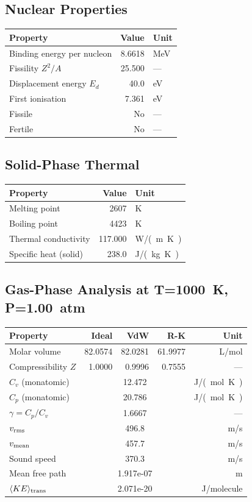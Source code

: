 \documentclass[11pt,a4paper]{article}
\begin{document}
\subsection{Nuclear Properties}
\begin{tabular}{lrl}
  \toprule
  Property & Value & Unit \\
  \midrule
  Binding energy per nucleon & 8.6618 & \si{MeV} \\
  Fissility $Z^2/A$ & 25.500 & --- \\
  Displacement energy $E_d$ & 40.0 & \si{eV} \\
  First ionisation & 7.361 & \si{eV} \\
  Fissile & No & --- \\
  Fertile & No & --- \\
  \bottomrule
\end{tabular}

\subsection{Solid-Phase Thermal}
\begin{tabular}{lrl}
  \toprule
  Property & Value & Unit \\
  \midrule
  Melting point & 2607 & \si{K} \\
  Boiling point & 4423 & \si{K} \\
  Thermal conductivity & 117.000 & \si{W/(m.K)} \\
  Specific heat (solid) & 238.0 & \si{J/(kg.K)} \\
  \bottomrule
\end{tabular}

\subsection{Gas-Phase Analysis at T=\SI{1000}{K}, P=\SI{1.00}{atm}}
\begin{tabular}{lrrrr}
  \toprule
  Property & Ideal & VdW & R-K & Unit \\
  \midrule
  Molar volume & 82.0574 & 82.0281 & 61.9977 & \si{L/mol} \\
  Compressibility $Z$ & 1.0000 & 0.9996 & 0.7555 & --- \\
  \midrule
  $C_v$ (monatomic) & \multicolumn{3}{c}{12.472} & \si{J/(mol.K)} \\
  $C_p$ (monatomic) & \multicolumn{3}{c}{20.786} & \si{J/(mol.K)} \\
  $\gamma = C_p/C_v$ & \multicolumn{3}{c}{1.6667} & --- \\
  $v_{\rm rms}$ & \multicolumn{3}{c}{496.8} & \si{m/s} \\
  $v_{\rm mean}$ & \multicolumn{3}{c}{457.7} & \si{m/s} \\
  Sound speed & \multicolumn{3}{c}{370.3} & \si{m/s} \\
  Mean free path & \multicolumn{3}{c}{1.917e-07} & \si{m} \\
  $\langle KE \rangle_{\rm trans}$ & \multicolumn{3}{c}{2.071e-20} & \si{J/molecule} \\
  \bottomrule
\end{tabular}
\end{document}
